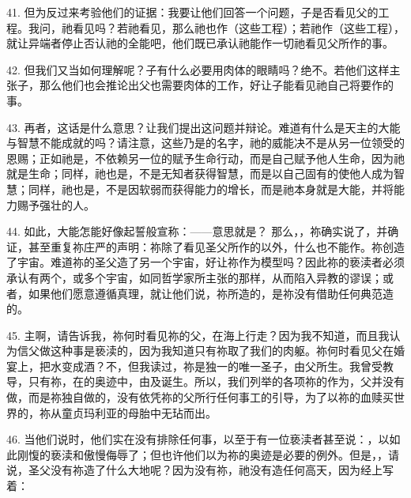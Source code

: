 41. 但为反过来考验他们的证据：我要让他们回答一个问题，子是否看见父的工程。我问，祂看见吗？若祂看见，那么祂也作（这些工程）；若祂作（这些工程），就让异端者停止否认祂的全能吧，他们既已承认祂能作一切祂看见父所作的事。\par

42. 但我们又当如何理解呢？子有什么必要用肉体的眼睛吗？绝不。若他们这样主张子，那么他们也会推论出父也需要肉体的工作，好让子能看见祂自己将要作的事。\par

43. 再者，这话是什么意思？让我们提出这问题并辩论。难道有什么是天主的大能与智慧不能成就的吗？请注意，这些乃是的名字，祂的威能决不是从另一位领受的恩赐；正如祂是，不依赖另一位的赋予生命行动，而是自己赋予他人生命，因为祂就是生命；同样，祂也是，不是无知者获得智慧，而是以自己固有的使他人成为智慧；同样，祂也是，不是因软弱而获得能力的增长，而是祂本身就是大能，并将能力赐予强壮的人。\par

44. 如此，大能怎能好像起誓般宣称：——意思就是？ 那么，，祢确实说了，并确证，甚至重复祢庄严的声明：祢除了看见圣父所作的以外，什么也不能作。祢创造了宇宙。难道祢的圣父造了另一个宇宙，好让祢作为模型吗？因此祢的亵渎者必须承认有两个，或多个宇宙，如同哲学家所主张的那样，从而陷入异教的谬误；或者，如果他们愿意遵循真理，就让他们说，祢所造的，是祢没有借助任何典范造的。\par

45. 主啊，请告诉我，祢何时看见祢的父，在海上行走？因为我不知道，而且我认为信父做这种事是亵渎的，因为我知道只有祢取了我们的肉躯。祢何时看见父在婚宴上，把水变成酒？不，但我读过，祢是独一的唯一圣子，由父所生。我曾受教导，只有祢，在的奥迹中，由及诞生。所以，我们列举的各项祢的作为，父并没有做，而是祢独自做的，没有依凭祢的父所行任何事工的引导，为了以祢的血赎买世界的，祢从童贞玛利亚的母胎中无玷而出。\par

46. 当他们说时，他们实在没有排除任何事，以至于有一位亵渎者甚至说：，以如此刚愎的亵渎和傲慢侮辱了；但也许他们以为祢的奥迹是必要的例外。但是，，请说，圣父没有祢造了什么大地呢？因为没有祢，祂没有造任何高天，因为经上写着：\par

